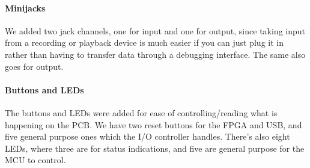 \paragraph{Minijacks}

We added two jack channels, one for input and one for output, since taking input
from a recording or playback device is much easier if you can just plug it in
rather than having to transfer data through a debugging interface. The same also
goes for output.

\paragraph{Buttons and LEDs}

The buttons and LEDs were added for ease of controlling/reading what is
happening on the PCB. We have two reset buttons for the FPGA and USB, and five
general purpose ones which the I/O controller handles. There's also eight LEDs,
where three are for status indications, and five are general purpose for the MCU
to control.
